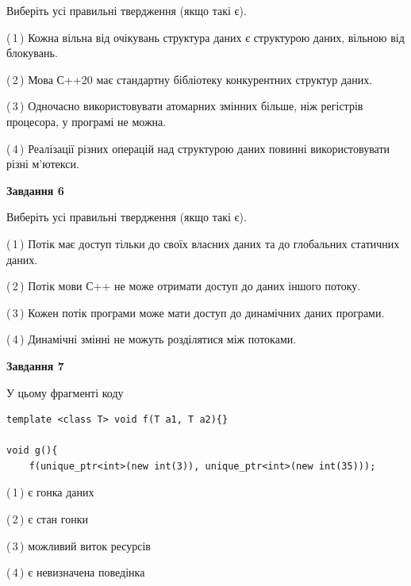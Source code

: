 \documentclass[12pt, ukrainian]{article}
\begin{document}
\begin {large}
{Виберіть усі правильні твердження (якщо такі є).\par
\vspace{2mm}

(\,1\,) Кожна вільна від очікувань структура даних є структурою даних, вільною від блокувань.%

(\,2\,) Мова С++20 має стандартну бібліотеку конкурентних структур даних.%

(\,3\,) Одночасно використовувати атомарних змінних більше, ніж регістрів процесора, у програмі не можна.%

(\,4\,) Реалізації різних операцій над структурою даних повинні використовувати різні м’ютекси.%
\newpage


\begin{center}
\textbf{Завдання 6}
\end{center}

Виберіть усі правильні твердження (якщо такі є).\par
\vspace{2mm}

(\,1\,) Потік має доступ тільки до своїх власних даних та до глобальних статичних даних.%

(\,2\,) Потік мови С++ не може отримати доступ до даних іншого потоку.%

(\,3\,) Кожен потік програми може мати доступ до динамічних даних програми.%

(\,4\,) Динамічні змінні не можуть розділятися між потоками.%


\begin{center}
\textbf{Завдання 7}
\end{center}

У цьому фрагменті коду
\begin{verbatim}
template <class T> void f(T a1, T a2){}

void g(){
    f(unique_ptr<int>(new int(3)), unique_ptr<int>(new int(35)));
\end{verbatim}

(\,1\,) є гонка даних%

(\,2\,) є стан гонки%

(\,3\,) можливий виток ресурсів%

(\,4\,) є невизначена поведінка%

}
\end {large}

\vspace{4mm}
\newpage
\end{document}
